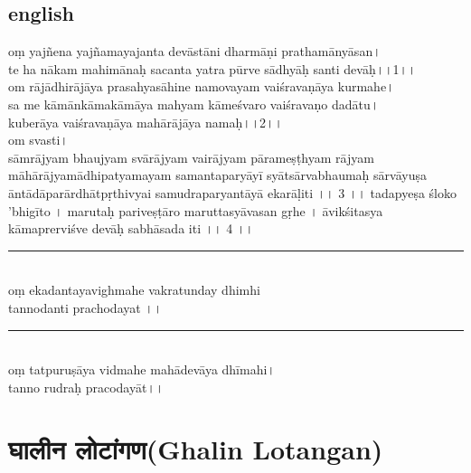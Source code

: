 \documentclass[letterpaper,twocolumn,openany,nodeprecatedcode]{dndbook}
\begin{document}
\begin{flushleft}
  \section*{english}
  oṃ yajñena yajñamayajanta devāstāni dharmāṇi prathamānyāsan। \\
  te ha nākam mahimānaḥ sacanta yatra pūrve sādhyāḥ santi devāḥ।।1।।\\
  om rājādhirājāya prasahyasāhine namovayam vaiśravaṇāya kurmahe।\\
  sa me kāmānkāmakāmāya mahyam kāmeśvaro vaiśravaṇo dadātu।\\
  kuberāya vaiśravaṇāya mahārājāya namaḥ।।2।।\\
  om svasti।\\
  sāmrājyam bhaujyam svārājyam vairājyam pārameṣṭhyam rājyam
  māhārājyamādhipatyamayam samantaparyāyī syātsārvabhaumaḥ sārvāyuṣa āntādāparārdhātpṛthivyai samudraparyantāyā ekarāḷiti ।। 3 ।।
  tadapyeṣa śloko 'bhigīto ।
  marutaḥ pariveṣṭāro maruttasyāvasan gṛhe ।
  āvikśitasya kāmaprerviśve devāḥ sabhāsada iti ।। 4 ।।
  \rule{\linewidth}{1pt} \\
  oṃ ekadantayavighmahe vakratunday dhimhi\\ tannodanti prachodayat ।।\\
  \rule{\linewidth}{1pt} \\
  oṃ tatpuruṣāya vidmahe mahādevāya dhīmahi।\\
  tanno rudraḥ pracodayāt।।
  \pagebreak
  \chapter{घालीन लोटांगण(Ghalin Lotangan)}


\end{flushleft}
\end{document}
